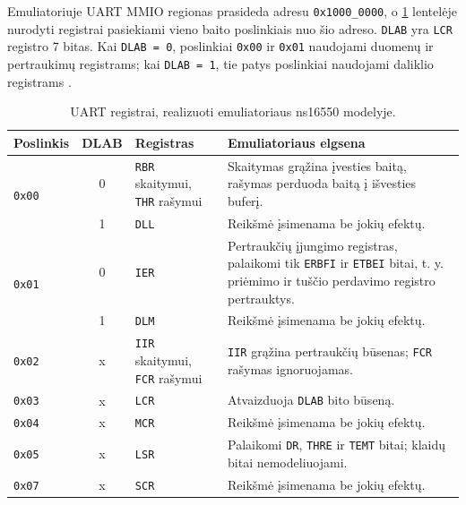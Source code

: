 Emuliatoriuje UART MMIO regionas prasideda adresu \texttt{0x1000\_0000}, o \ref{table:uart_registers} lentelėje nurodyti registrai pasiekiami vieno baito poslinkiais nuo šio adreso. \texttt{DLAB} yra \texttt{LCR} registro 7 bitas. Kai \texttt{DLAB = 0}, poslinkiai \texttt{0x00} ir \texttt{0x01} naudojami duomenų ir pertraukimų registrams; kai \texttt{DLAB = 1}, tie patys poslinkiai naudojami daliklio registrams \cite[p.~18--19]{ti-pc16550d}.

\begin{table}[h]
    \centering
    \small
    \begin{tabular}{|l|c|l|p{}|}
        \hline
        \textbf{Poslinkis} & \textbf{DLAB} & \textbf{Registras} & \textbf{Emuliatoriaus elgsena} \\
        \hline

        \multirow{2}{*}{\texttt{0x00}}
            & 0 & \texttt{RBR} skaitymui, \texttt{THR} rašymui
            & Skaitymas grąžina įvesties baitą, rašymas perduoda baitą į išvesties buferį. \\
        \cline{2-4}
            & 1 & \texttt{DLL}
            & Reikšmė įsimenama be jokių efektų. \\
        \hline

        \multirow{2}{*}{\texttt{0x01}}
            & 0 & \texttt{IER}
            & Pertraukčių įjungimo registras, palaikomi tik \texttt{ERBFI} ir \texttt{ETBEI} bitai, t. y. priėmimo ir tuščio perdavimo registro pertrauktys. \\
        \cline{2-4}
            & 1 & \texttt{DLM}
            & Reikšmė įsimenama be jokių efektų. \\
        \hline

        \texttt{0x02}
            & x & \texttt{IIR} skaitymui, \texttt{FCR} rašymui
            & \texttt{IIR} grąžina pertraukčių būsenas; \texttt{FCR} rašymas ignoruojamas. \\
        \hline

        \texttt{0x03}
            & x & \texttt{LCR}
            & Atvaizduoja \texttt{DLAB} bito būseną. \\
        \hline

        \texttt{0x04}
            & x & \texttt{MCR}
            & Reikšmė įsimenama be jokių efektų. \\
        \hline

        \texttt{0x05}
            & x & \texttt{LSR}
            & Palaikomi \texttt{DR}, \texttt{THRE} ir \texttt{TEMT} bitai; klaidų bitai nemodeliuojami. \\
        \hline

        \texttt{0x07}
            & x & \texttt{SCR}
            & Reikšmė įsimenama be jokių efektų. \\
        \hline
    \end{tabular}
    \caption{UART registrai, realizuoti emuliatoriaus {\normalfont\ttfamily ns16550}  modelyje.}
    \label{table:uart_registers}
\end{table}

